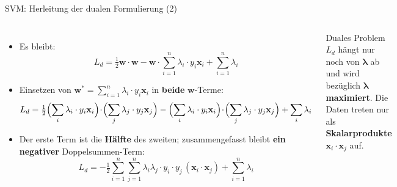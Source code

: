\begin{frame}{SVM: Herleitung der dualen Formulierung (2)}
\begin{columns}[b]

\footnotesize
\begin{itemize}
  \item Es bleibt:
        \[
          L_d = \tfrac{1}{2}\mathbf{w}\cdot\mathbf{w}
          - \mathbf{w}\cdot\sum_{i=1}^{n}\lambda_i \cdot y_i \mathbf{x}_i
          + \sum_{i=1}^{n}\lambda_i
        \]
  \item Einsetzen von
        $\mathbf{w}^{*} = \sum_{i=1}^{n}\lambda_i \cdot y_i \mathbf{x}_i$
        in \textbf{beide} $\mathbf{w}$-Terme:
        \[
          L_d = \tfrac{1}{2}
          \Bigl(\sum_{i}\lambda_i \cdot y_i \mathbf{x}_i\Bigr)\!\cdot\!
          \Bigl(\sum_{j}\lambda_j \cdot y_j \mathbf{x}_j\Bigr)
          - \Bigl(\sum_{i}\lambda_i \cdot y_i \mathbf{x}_i\Bigr)\!\cdot\!
          \Bigl(\sum_{j}\lambda_j \cdot y_j \mathbf{x}_j\Bigr)
          + \sum_{i}\lambda_i
        \]
  \item Der erste Term ist die \textbf{Hälfte} des zweiten; zusammengefasst
        bleibt \textbf{ein negativer} Doppelsummen-Term:
        \[
          L_d = -\tfrac{1}{2}\sum_{i=1}^{n}\sum_{j=1}^{n}
          \lambda_i \lambda_j \cdot y_i \cdot y_j\,(\mathbf{x}_i\!\cdot\mathbf{x}_j)
          + \sum_{i=1}^{n}\lambda_i
        \]
\end{itemize}

\begin{blockC1}{\footnotesize Duales Problem}
\footnotesize
$L_d$ hängt nur noch von $\boldsymbol{\lambda}$ ab und wird bezüglich
$\boldsymbol{\lambda}$ \textbf{maximiert}. Die Daten treten nur als
\textbf{Skalarprodukte} $\mathbf{x}_i\!\cdot\mathbf{x}_j$ auf.
\end{blockC1}
\end{columns}
\end{frame}


